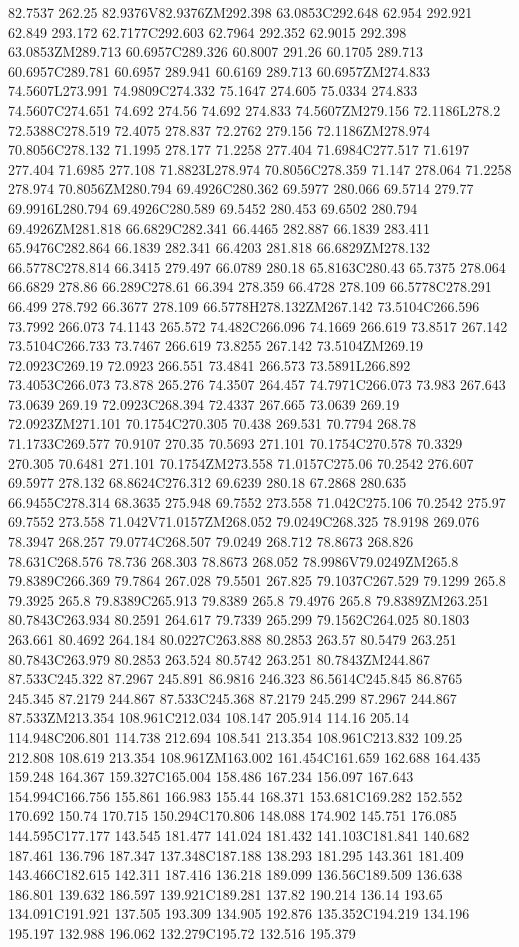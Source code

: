 82.7537 262.25 82.9376V82.9376ZM292.398 63.0853C292.648 62.954 292.921 62.849 293.172 62.7177C292.603 62.7964 292.352 62.9015 292.398 63.0853ZM289.713 60.6957C289.326 60.8007 291.26 60.1705 289.713 60.6957C289.781 60.6957 289.941 60.6169 289.713 60.6957ZM274.833 74.5607L273.991 74.9809C274.332 75.1647 274.605 75.0334 274.833 74.5607C274.651 74.692 274.56 74.692 274.833 74.5607ZM279.156 72.1186L278.2 72.5388C278.519 72.4075 278.837 72.2762 279.156 72.1186ZM278.974 70.8056C278.132 71.1995 278.177 71.2258 277.404 71.6984C277.517 71.6197 277.404 71.6985 277.108 71.8823L278.974 70.8056C278.359 71.147 278.064 71.2258 278.974 70.8056ZM280.794 69.4926C280.362 69.5977 280.066 69.5714 279.77 69.9916L280.794 69.4926C280.589 69.5452 280.453 69.6502 280.794 69.4926ZM281.818 66.6829C282.341 66.4465 282.887 66.1839 283.411 65.9476C282.864 66.1839 282.341 66.4203 281.818 66.6829ZM278.132 66.5778C278.814 66.3415 279.497 66.0789 280.18 65.8163C280.43 65.7375 278.064 66.6829 278.86 66.289C278.61 66.394 278.359 66.4728 278.109 66.5778C278.291 66.499 278.792 66.3677 278.109 66.5778H278.132ZM267.142 73.5104C266.596 73.7992 266.073 74.1143 265.572 74.482C266.096 74.1669 266.619 73.8517 267.142 73.5104C266.733 73.7467 266.619 73.8255 267.142 73.5104ZM269.19 72.0923C269.19 72.0923 266.551 73.4841 266.573 73.5891L266.892 73.4053C266.073 73.878 265.276 74.3507 264.457 74.7971C266.073 73.983 267.643 73.0639 269.19 72.0923C268.394 72.4337 267.665 73.0639 269.19 72.0923ZM271.101 70.1754C270.305 70.438 269.531 70.7794 268.78 71.1733C269.577 70.9107 270.35 70.5693 271.101 70.1754C270.578 70.3329 270.305 70.6481 271.101 70.1754ZM273.558 71.0157C275.06 70.2542 276.607 69.5977 278.132 68.8624C276.312 69.6239 280.18 67.2868 280.635 66.9455C278.314 68.3635 275.948 69.7552 273.558 71.042C275.106 70.2542 275.97 69.7552 273.558 71.042V71.0157ZM268.052 79.0249C268.325 78.9198 269.076 78.3947 268.257 79.0774C268.507 79.0249 268.712 78.8673 268.826 78.631C268.576 78.736 268.303 78.8673 268.052 78.9986V79.0249ZM265.8 79.8389C266.369 79.7864 267.028 79.5501 267.825 79.1037C267.529 79.1299 265.8 79.3925 265.8 79.8389C265.913 79.8389 265.8 79.4976 265.8 79.8389ZM263.251 80.7843C263.934 80.2591 264.617 79.7339 265.299 79.1562C264.025 80.1803 263.661 80.4692 264.184 80.0227C263.888 80.2853 263.57 80.5479 263.251 80.7843C263.979 80.2853 263.524 80.5742 263.251 80.7843ZM244.867 87.533C245.322 87.2967 245.891 86.9816 246.323 86.5614C245.845 86.8765 245.345 87.2179 244.867 87.533C245.368 87.2179 245.299 87.2967 244.867 87.533ZM213.354 108.961C212.034 108.147 205.914 114.16 205.14 114.948C206.801 114.738 212.694 108.541 213.354 108.961C213.832 109.25 212.808 108.619 213.354 108.961ZM163.002 161.454C161.659 162.688 164.435 159.248 164.367 159.327C165.004 158.486 167.234 156.097 167.643 154.994C166.756 155.861 166.983 155.44 168.371 153.681C169.282 152.552 170.692 150.74 170.715 150.294C170.806 148.088 174.902 145.751 176.085 144.595C177.177 143.545 181.477 141.024 181.432 141.103C181.841 140.682 187.461 136.796 187.347 137.348C187.188 138.293 181.295 143.361 181.409 143.466C182.615 142.311 187.416 136.218 189.099 136.56C189.509 136.638 186.801 139.632 186.597 139.921C189.281 137.82 190.214 136.14 193.65 134.091C191.921 137.505 193.309 134.905 192.876 135.352C194.219 134.196 195.197 132.988 196.062 132.279C195.72 132.516 195.379 
